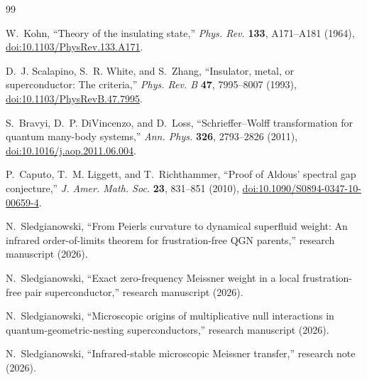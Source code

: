 \documentclass[11pt]{article}
\theoremstyle{definition}
\theoremstyle{remark}
\begin{document}
\begin{thebibliography}{99}

W.~Kohn,
``Theory of the insulating state,''
\emph{Phys. Rev.} \textbf{133}, A171--A181 (1964),
\href{https://doi.org/10.1103/PhysRev.133.A171}{doi:10.1103/PhysRev.133.A171}.

D.~J. Scalapino, S.~R. White, and S.~Zhang,
``Insulator, metal, or superconductor: The criteria,''
\emph{Phys. Rev. B} \textbf{47}, 7995--8007 (1993),
\href{https://doi.org/10.1103/PhysRevB.47.7995}{doi:10.1103/PhysRevB.47.7995}.

S.~Bravyi, D.~P. DiVincenzo, and D.~Loss,
``Schrieffer--Wolff transformation for quantum many-body systems,''
\emph{Ann. Phys.} \textbf{326}, 2793--2826 (2011),
\href{https://doi.org/10.1016/j.aop.2011.06.004}{doi:10.1016/j.aop.2011.06.004}.

P.~Caputo, T.~M. Liggett, and T.~Richthammer,
``Proof of Aldous' spectral gap conjecture,''
\emph{J. Amer. Math. Soc.} \textbf{23}, 831--851 (2010),
\href{https://doi.org/10.1090/S0894-0347-10-00659-4}{doi:10.1090/S0894-0347-10-00659-4}.

N.~Sledgianowski,
``From Peierls curvature to dynamical superfluid weight: An infrared
order-of-limits theorem for frustration-free QGN parents,''
research manuscript (2026).

N.~Sledgianowski,
``Exact zero-frequency Meissner weight in a local frustration-free pair
superconductor,'' research manuscript (2026).

N.~Sledgianowski,
``Microscopic origins of multiplicative null interactions in
quantum-geometric-nesting superconductors,'' research manuscript (2026).

N.~Sledgianowski,
``Infrared-stable microscopic Meissner transfer,'' research note (2026).

\end{thebibliography}
\end{document}
